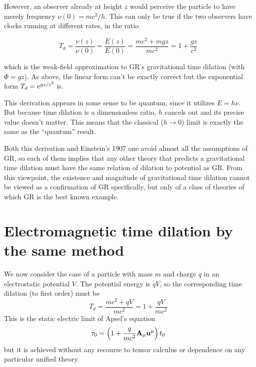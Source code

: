 However, an observer already at height $z$ would perceive the particle to have merely frequency $\nu(0) = mc^2/h$. This can only be true if the two observers have clocks running at different rates, in the ratio

\begin{equation}
T_d = \frac{\nu(z)}{\nu(0)} = \frac{E(z)}{E(0)} = \frac{mc^2 + mgz}{mc^2} = 1 + \frac{gz}{c^2}
\end{equation}

\noindent which is the weak-field approximation to GR's gravitational time dilation
(with $\Phi = gz$).
As above, the linear form can't be exactly correct but the exponential form
$T_d = {\rm e}^{gz/c^2}$ is.

This derivation appears in some sense to be quantum, since it utilizes $E = h\nu$.
But because time dilation is a dimensionless ratio, $h$ cancels out and its precise value doesn't matter.
This means that the classical ($h \to 0$) limit is exactly the same as the ``quantum'' result.

Both this derivation and Einstein's 1907 one avoid almost all the assumptions of GR,
so each of them implies that any other theory that predicts a gravitational time dilation
must have the same relation of dilation to potential as GR.
From this viewpoint, the existence and magnitude of gravitational time dilation
cannot be viewed as a confirmation of GR specifically,
but only of a class of theories of which GR is the best known example.


\section{Electromagnetic time dilation by the same method}
\label{sec:4}

We now consider the case of a particle with mass $m$ and charge $q$ in an electrostatic potential $V$.
The potential energy is $qV$, so the corresponding time dilation (to first order) must be
\begin{equation}
T_d =  \frac{mc^2 + qV}{mc^2} =  1 + \frac{qV}{mc^2}
\end{equation}
This is the static electric limit of Apsel's equation \cite{Apsel1979}
\begin{equation}
\tau_0 =  \left(1 + \frac{q}{mc^2} {\bf A}_\mu {\bf u}^\mu \right) t_0
\end{equation}
but it is achieved without any recourse to tensor calculus
or dependence on any particular unified theory.

